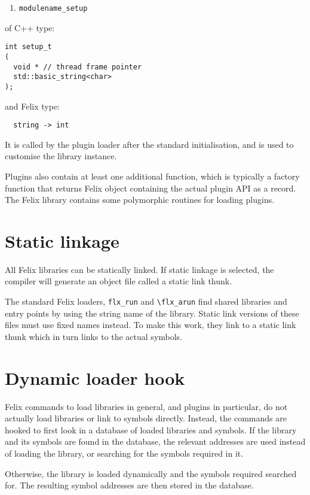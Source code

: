 \documentclass[oneside]{book}
\begin{document}
\begin{enumerate}
\item \verb$modulename_setup$
\end{enumerate}

of C++ type:

\begin{verbatim}
int setup_t
(
  void * // thread frame pointer
  std::basic_string<char>
);
\end{verbatim}

and Felix type:

\begin{verbatim}
  string -> int
\end{verbatim}

It is called by the plugin loader after the standard initialisation,
and is used to customise the library instance.

Plugins also contain at least one additional function, which is typically a factory
function that returns Felix object containing the actual plugin API
as a record. The Felix library contains some polymorphic routines
for loading plugins.

\section{Static linkage}
All Felix libraries can be statically linked. If static linkage is selected,
the compiler will generate an object file called a static link thunk.

The standard Felix loaders, \verb$flx_run$ and \verb$\flx_arun$ find shared
libraries and entry points by using the string name of the library.
Static link versions of these files must use fixed names instead.
To make this work, they link to a static link thunk which in turn
links to the actual symbols.

\section{Dynamic loader hook}
Felix commands to load libraries in general, and plugins in
particular, do not actually load libraries or link to symbols
directly. Instead, the commands are hooked to first look in
a database of loaded libraries and symbols. If the library and
its symbols are found in the database, the relevant addresses
are used instead of loading the library, or searching for the
symbols required in it.

Otherwise, the library is loaded dynamically and the symbols
required searched for. The resulting symbol addresses are
then stored in the database.
\end{document}
